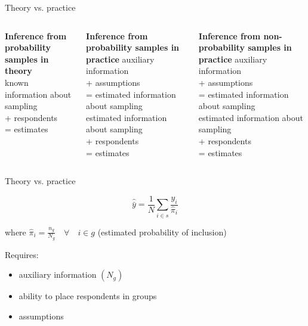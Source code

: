 \documentclass[aspectratio=169]{beamer}
\begin{document}
\begin{frame}{Theory vs. practice}

\begin{columns}

\begin{column}{0.32\textwidth}
\textbf{Inference from probability samples in theory} \\
\vspace{5.5em}
known information about sampling \\
+ respondents \\
= estimates
\end{column}
\pause
\begin{column}{0.32\textwidth}
\textbf{Inference from probability samples in practice}
\vfill
\vspace{0.5em}
auxiliary information \\
+ assumptions \\
= estimated information about sampling \\
\vspace{0.5em}
estimated information about sampling \\
+ respondents \\
= estimates
\end{column}
\pause
\begin{column}{0.32\textwidth}
\textbf{Inference from non-probability samples in practice}
\vfill
\vspace{0.5em}
auxiliary information \\
+ assumptions \\
= estimated information about sampling \\
\vspace{0.5em}
estimated information about sampling \\
+ respondents \\
= estimates
\end{column}

\end{columns}

\end{frame}
\begin{frame}{Theory vs. practice}

$$\hat{\bar{y}} = \frac{1}{N}\sum_{i \in s}\frac{y_i}{\hat{\pi}_i}$$

where $\hat{\pi}_i = \frac{n_g}{N_g} \quad \forall \quad i \in g$ (estimated probability of inclusion)

\vfill

Requires:
\begin{itemize}
\item auxiliary information $(N_g)$
\item ability to place respondents in groups
\item assumptions
\end{itemize}

\end{frame}
\end{document}
